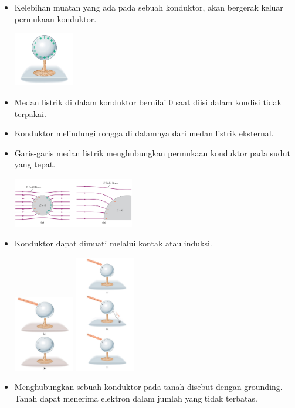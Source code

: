 \documentclass[twocolumn, 11pt]{article}%
\begin{document}
    \begin{itemize}
        \item Kelebihan muatan yang ada pada sebuah konduktor, akan bergerak keluar permukaan konduktor.\\
            \begin{center}
                \includegraphics[width=100px]{18.png}
            \end{center}
        \item Medan listrik di dalam konduktor bernilai 0 saat diisi dalam kondisi tidak terpakai.
        \item Konduktor melindungi rongga di dalamnya dari medan listrik eksternal.
        \item Garis-garis medan listrik menghubungkan permukaan konduktor pada sudut yang tepat.
            \begin{center}
                \includegraphics[width=200px]{19.png}
            \end{center}
        \item Konduktor dapat dimuati melalui kontak atau induksi.
            \begin{center}
                \includegraphics[width=100px]{20.png}
                \includegraphics[width=100px]{21.png}
            \end{center}
        \item Menghubungkan sebuah konduktor pada tanah disebut dengan grounding. Tanah dapat menerima elektron dalam jumlah yang tidak terbatas.
    \end{itemize}
    
\end{document}

